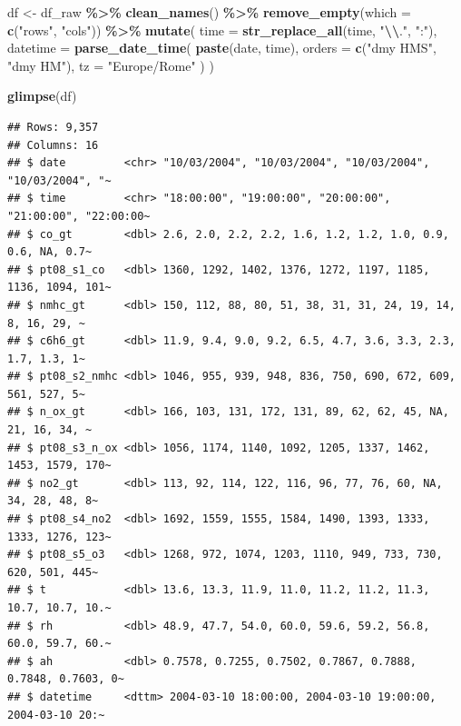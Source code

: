 \documentclass[
]{article}
\newenvironment{Shaded}{\begin{snugshade}}{\end{snugshade}}
\newcommand{\AttributeTok}[1]{\textcolor[rgb]{0.13,0.29,0.53}{#1}}
\newcommand{\FunctionTok}[1]{\textcolor[rgb]{0.13,0.29,0.53}{\textbf{#1}}}
\newcommand{\NormalTok}[1]{#1}
\newcommand{\OtherTok}[1]{\textcolor[rgb]{0.56,0.35,0.01}{#1}}
\newcommand{\SpecialCharTok}[1]{\textcolor[rgb]{0.81,0.36,0.00}{\textbf{#1}}}
\newcommand{\StringTok}[1]{\textcolor[rgb]{0.31,0.60,0.02}{#1}}
\begin{document}
\begin{Shaded}
\begin{Highlighting}[]
\NormalTok{df }\OtherTok{\textless{}{-}}\NormalTok{ df\_raw }\SpecialCharTok{\%\textgreater{}\%}
  \FunctionTok{clean\_names}\NormalTok{() }\SpecialCharTok{\%\textgreater{}\%}
  \FunctionTok{remove\_empty}\NormalTok{(}\AttributeTok{which =} \FunctionTok{c}\NormalTok{(}\StringTok{"rows"}\NormalTok{, }\StringTok{"cols"}\NormalTok{)) }\SpecialCharTok{\%\textgreater{}\%}
  \FunctionTok{mutate}\NormalTok{(}
    \AttributeTok{time =} \FunctionTok{str\_replace\_all}\NormalTok{(time, }\StringTok{"}\SpecialCharTok{\textbackslash{}\textbackslash{}}\StringTok{."}\NormalTok{, }\StringTok{":"}\NormalTok{),}
    \AttributeTok{datetime =} \FunctionTok{parse\_date\_time}\NormalTok{(}
      \FunctionTok{paste}\NormalTok{(date, time),}
      \AttributeTok{orders =} \FunctionTok{c}\NormalTok{(}\StringTok{"dmy HMS"}\NormalTok{, }\StringTok{"dmy HM"}\NormalTok{),}
      \AttributeTok{tz =} \StringTok{"Europe/Rome"}
\NormalTok{    )}
\NormalTok{  )}

\FunctionTok{glimpse}\NormalTok{(df)}
\end{Highlighting}
\end{Shaded}

\begin{verbatim}
## Rows: 9,357
## Columns: 16
## $ date         <chr> "10/03/2004", "10/03/2004", "10/03/2004", "10/03/2004", "~
## $ time         <chr> "18:00:00", "19:00:00", "20:00:00", "21:00:00", "22:00:00~
## $ co_gt        <dbl> 2.6, 2.0, 2.2, 2.2, 1.6, 1.2, 1.2, 1.0, 0.9, 0.6, NA, 0.7~
## $ pt08_s1_co   <dbl> 1360, 1292, 1402, 1376, 1272, 1197, 1185, 1136, 1094, 101~
## $ nmhc_gt      <dbl> 150, 112, 88, 80, 51, 38, 31, 31, 24, 19, 14, 8, 16, 29, ~
## $ c6h6_gt      <dbl> 11.9, 9.4, 9.0, 9.2, 6.5, 4.7, 3.6, 3.3, 2.3, 1.7, 1.3, 1~
## $ pt08_s2_nmhc <dbl> 1046, 955, 939, 948, 836, 750, 690, 672, 609, 561, 527, 5~
## $ n_ox_gt      <dbl> 166, 103, 131, 172, 131, 89, 62, 62, 45, NA, 21, 16, 34, ~
## $ pt08_s3_n_ox <dbl> 1056, 1174, 1140, 1092, 1205, 1337, 1462, 1453, 1579, 170~
## $ no2_gt       <dbl> 113, 92, 114, 122, 116, 96, 77, 76, 60, NA, 34, 28, 48, 8~
## $ pt08_s4_no2  <dbl> 1692, 1559, 1555, 1584, 1490, 1393, 1333, 1333, 1276, 123~
## $ pt08_s5_o3   <dbl> 1268, 972, 1074, 1203, 1110, 949, 733, 730, 620, 501, 445~
## $ t            <dbl> 13.6, 13.3, 11.9, 11.0, 11.2, 11.2, 11.3, 10.7, 10.7, 10.~
## $ rh           <dbl> 48.9, 47.7, 54.0, 60.0, 59.6, 59.2, 56.8, 60.0, 59.7, 60.~
## $ ah           <dbl> 0.7578, 0.7255, 0.7502, 0.7867, 0.7888, 0.7848, 0.7603, 0~
## $ datetime     <dttm> 2004-03-10 18:00:00, 2004-03-10 19:00:00, 2004-03-10 20:~
\end{verbatim}
\end{document}
